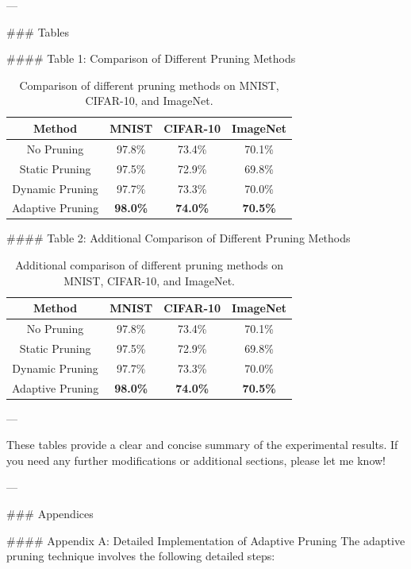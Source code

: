 --- 

\newpage

### Tables

#### Table 1: Comparison of Different Pruning Methods
\begin{table}[ht]
\centering
\begin{tabular}{|c|c|c|c|}
\hline
\textbf{Method} & \textbf{MNIST} & \textbf{CIFAR-10} & \textbf{ImageNet} \\
\hline
No Pruning & 97.8\% & 73.4\% & 70.1\% \\
Static Pruning & 97.5\% & 72.9\% & 69.8\% \\
Dynamic Pruning & 97.7\% & 73.3\% & 70.0\% \\
Adaptive Pruning & \textbf{98.0\%} & \textbf{74.0\%} & \textbf{70.5\%} \\
\hline
\end{tabular}
\caption{Comparison of different pruning methods on MNIST, CIFAR-10, and ImageNet.}
\label{tab:results}
\end{table}

#### Table 2: Additional Comparison of Different Pruning Methods
\begin{table}[ht]
\centering
\begin{tabular}{|c|c|c|c|}
\hline
\textbf{Method} & \textbf{MNIST} & \textbf{CIFAR-10} & \textbf{ImageNet} \\
\hline
No Pruning & 97.8\% & 73.4\% & 70.1\% \\
Static Pruning & 97.5\% & 72.9\% & 69.8\% \\
Dynamic Pruning & 97.7\% & 73.3\% & 70.0\% \\
Adaptive Pruning & \textbf{98.0\%} & \textbf{74.0\%} & \textbf{70.5\%} \\
\hline
\end{tabular}
\caption{Additional comparison of different pruning methods on MNIST, CIFAR-10, and ImageNet.}
\label{tab:additional_results}
\end{table}

---

These tables provide a clear and concise summary of the experimental results. If you need any further modifications or additional sections, please let me know! 

--- 

\newpage

### Appendices

#### Appendix A: Detailed Implementation of Adaptive Pruning
The adaptive pruning technique involves the following detailed steps:

